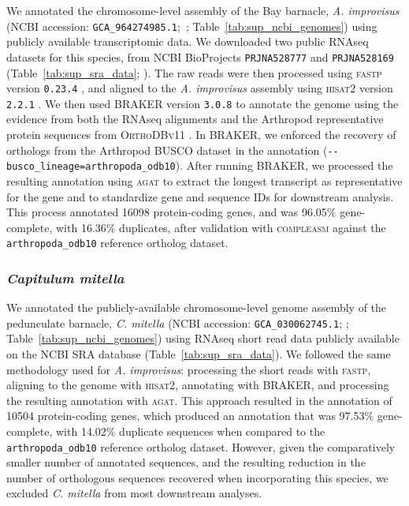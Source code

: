 We annotated the chromosome-level assembly of the Bay barnacle, \textit{A. improvisus}
(NCBI accession: \texttt{GCA\_964274985.1};~\cite{bishop_genome_2025};
Table~\ref{tab:sup_ncbi_genomes}) using publicly available transcriptomic data.
We downloaded two public RNAseq datasets for this species, from NCBI BioProjects
\texttt{PRJNA528777} and \texttt{PRJNA528169} (Table~\ref{tab:sup_sra_data};
\cite{abramova_sensory_2019}).
The raw reads were then processed using \textsc{fastp} version \texttt{0.23.4}
\citep{chen_ultrafast_2023,chen_fastp_2018}, and aligned to the \textit{A. improvisus}
assembly using \textsc{hisat2} version \texttt{2.2.1} \citep{kim_graph-based_2019}.
We then used \textsc{BRAKER} version \texttt{3.0.8} \citep{gabriel_braker3_2024} to
annotate the genome using the evidence from both the RNAseq alignments and the
Arthropod representative protein sequences from \textsc{OrthoDBv11}
\citep{kriventseva_orthodb_2019,zdobnov_orthodb_2021}.
In \textsc{BRAKER}, we enforced the recovery of orthologs from the Arthropod
\textsc{BUSCO} dataset in the annotation (\texttt{-{}-busco\_lineage=arthropoda\_odb10}).
After running \textsc{BRAKER}, we processed the resulting annotation using \textsc{agat}
to extract the longest transcript as representative for the gene and to standardize gene
and sequence IDs for downstream analysis.
This process annotated \num{16098} protein-coding genes, and was 96.05\% gene-complete,
with 16.36\% duplicates, after validation with \textsc{compleasm} against the
\texttt{arthropoda\_odb10} reference ortholog dataset.

\subsubsection*{\textit{Capitulum mitella}}

We annotated the publicly-available chromosome-level genome assembly of the pedunculate
barnacle, \textit{C. mitella} (NCBI accession: \texttt{GCA\_030062745.1};
\cite{chen_capmit_2021}; Table~\ref{tab:sup_ncbi_genomes}) using RNAseq short read data
publicly available on the NCBI SRA database (Table~\ref{tab:sup_sra_data}).
We followed the same methodology used for \textit{A. improvisus}: processing the
short reads with \textsc{fastp}, aligning to the genome with \textsc{hisat2}, annotating
with \textsc{BRAKER}, and processing the resulting annotation with \textsc{agat}.
This approach resulted in the annotation of \num{10504} protein-coding genes, which
produced an annotation that was 97.53\% gene-complete, with 14.02\% duplicate sequences
when compared to the \texttt{arthropoda\_odb10} reference ortholog dataset.
However, given the comparatively smaller number of annotated sequences, and the
resulting reduction in the number of orthologous sequences recovered when incorporating
this species, we excluded \textit{C. mitella} from most downstream analyses.

